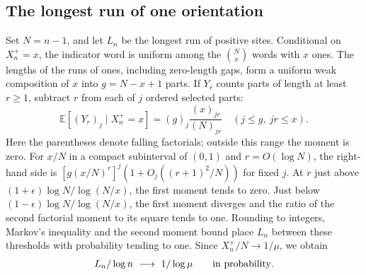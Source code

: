 \subsection*{The longest run of one orientation}
Set \(N=n-1\), and let \(L_n\) be the longest run of positive sites.
Conditional on \(X_n^+=x\), the indicator word is uniform among the
\(\binom Nx\) words with \(x\) ones. The lengths of the runs of ones,
including zero-length gaps, form a uniform weak composition of \(x\)
into \(g=N-x+1\) parts. If \(Y_r\) counts parts of length at least
\(r\ge1\), subtract \(r\) from each of \(j\) ordered selected parts:
\[
 {\mathbb E}[(Y_r)_j\mid X_n^+=x]=(g)_j\frac{(x)_{jr}}{(N)_{jr}}
 \quad(j\le g,\ jr\le x).
\]
Here the parentheses denote falling factorials; outside this range
the moment is zero. For \(x/N\) in a compact subinterval of \((0,1)\)
and \(r=O(\log N)\), the right-hand side is
\([g(x/N)^r]^j(1+O_j((r+1)^2/N))\) for fixed \(j\).
At \(r\) just above \((1+\epsilon)\log N/\log(N/x)\), the first
moment tends to zero. Just below
\((1-\epsilon)\log N/\log(N/x)\), the first moment diverges and the
ratio of the second factorial moment to its square tends to one.
Rounding to integers, Markov's inequality and the second moment
bound place \(L_n\) between these thresholds with probability tending
to one. Since \(X_n^+/N\to1/\mu\), we obtain
\[
                         L_n/\log n\ \longrightarrow\ 1/\log\mu
                         \qquad\hbox{in probability}.
\]
